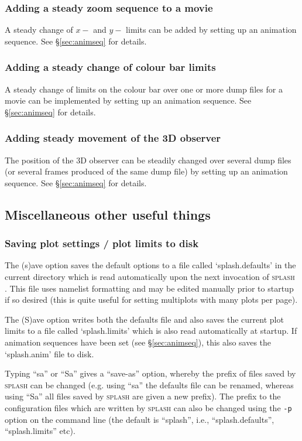 \documentclass[a4paper,10pt]{article}
\newcommand{\splash}{\textsc{splash }}
\begin{document}
\subsubsection{ Adding a steady zoom sequence to a movie}
 A steady change of $x-$ and $y-$ limits can be added by setting up an animation sequence. See \S\ref{sec:animseq} for details.

\subsubsection{ Adding a steady change of colour bar limits}
 A steady change of limits on the colour bar over one or more dump files for a movie can be implemented by setting up an animation sequence. See \S\ref{sec:animseq} for details.

\subsubsection{ Adding steady movement of the 3D observer}
\label{sec:move3Dobserver}
 The position of the 3D observer can be steadily changed over several dump files (or several frames produced of the same dump file) by setting up an animation sequence.  See \S\ref{sec:animseq} for details.

\subsection{Miscellaneous other useful things}%

\subsubsection{ Saving plot settings / plot limits to disk}
 The (s)ave option saves the default options to a file called `splash.defaults' in the
current directory which is read automatically upon the next invocation of
\splash. This file uses namelist formatting and may be edited manually prior to  
startup if so desired (this is quite useful for setting multiplots with many plots per
 page).
 
  The (S)ave option writes both the defaults file and also saves the current plot
limits to a file called `splash.limits' which is also read automatically
at startup. If animation sequences have been set (see \S\ref{sec:animseq}), this also saves the `splash.anim' file to disk.

 Typing ``sa'' or ``Sa'' gives a ``save-as'' option, whereby the prefix of files saved by \splash can be changed (e.g. using ``sa'' the defaults file can be renamed, whereas using ``Sa'' all files saved by \splash are given a new prefix). The prefix to the configuration files which are written by \splash can also be changed using the \verb+-p+ option on the command line (the default is ``splash'', i.e., ``splash.defaults'', ``splash.limits'' etc).
\end{document}
